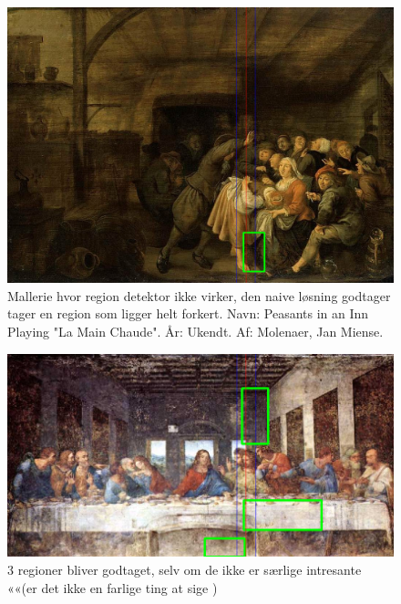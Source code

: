 \begin{figure}[h!!]
	\begin{center}
		\includegraphics[scale=0.3,angle=0]{afsnit/afprovning/billeder/naive_losning/naiv_virker_ikke1.png}
	\end{center}
	\caption[]{Mallerie hvor region detektor ikke virker, den naive løsning godtager tager en region som ligger helt forkert. Navn: Peasants in an Inn Playing "La Main Chaude". År: Ukendt. Af: Molenaer, Jan Miense.}
	\label{naiv_virker_ikke1}
\end{figure}

\begin{figure}[h!!]
	\begin{center}
		\includegraphics[scale=0.3,angle=0]{afsnit/afprovning/billeder/naive_losning/naiv_virker_ikke2.png}
	\end{center}
	\caption[]{3 regioner bliver godtaget, selv om de ikke er særlige intresante ««(er det ikke en farlige ting at sige )}
	\label{naiv_virker_ikke2}
\end{figure}

